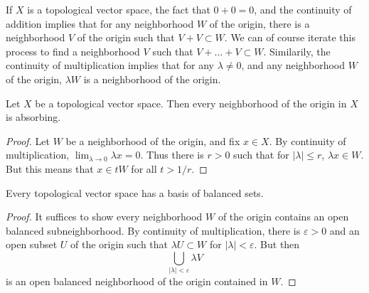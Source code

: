 If $X$ is a topological vector space, the fact that $0 + 0 = 0$, and the continuity of addition implies that for any neighborhood $W$ of the origin, there is a neighborhood $V$ of the origin such that $V + V \subset W$. We can of course iterate this process to find a neighborhood $V$ such that $V + \dots + V \subset W$. Similarily, the continuity of multiplication implies that for any $\lambda \neq 0$, and any neighborhood $W$ of the origin, $\lambda W$ is a neighborhood of the origin.

\begin{theorem}
    Let $X$ be a topological vector space. Then every neighborhood of the origin in $X$ is absorbing.
\end{theorem}
\begin{proof}
    Let $W$ be a neighborhood of the origin, and fix $x \in X$. By continuity of multiplication, $\lim_{\lambda \to 0} \lambda x = 0$. Thus there is $r > 0$ such that for $|\lambda| \leq r$, $\lambda x \in W$. But this means that $x \in t W$ for all $t > 1/r$.
\end{proof}

\begin{corollary}
    Every topological vector space has a basis of balanced sets.
\end{corollary}
\begin{proof}
    It suffices to show every neighborhood $W$ of the origin contains an open balanced subneighborhood. By continuity of multiplication, there is $\varepsilon > 0$ and an open subset $U$ of the origin such that $\lambda U \subset W$ for $|\lambda| < \varepsilon$. But then
    \[ \bigcup_{|\lambda| < \varepsilon} \lambda V \]
    is an open balanced neighborhood of the origin contained in $W$.
\end{proof}

